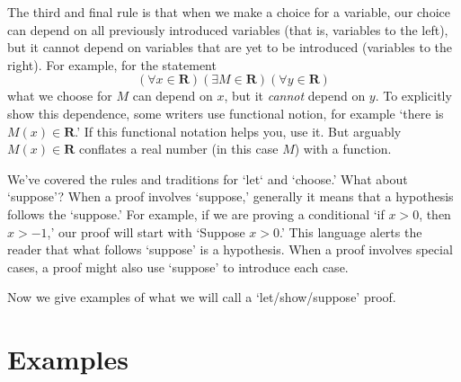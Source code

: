 \documentclass[12pt,fleqn]{article}
\newcommand{\reals}{\mathbf{R}}
\newcounter{ex}\setcounter{ex}{0}
\begin{document}
The third and final rule is that when we  make a choice for a variable, our choice can depend on all previously
introduced variables (that is, variables to the left), but it cannot  depend on variables that are yet to be introduced (variables to the right). 
For example, for the statement
\begin{equation*}
   \left(\forall x \in \reals\right)
   \left(\exists M \in \reals\right)
   \left(\forall y \in \reals \right)
 \end{equation*}
 what we choose for $M$ can depend on $x$, but it \emph{cannot}  depend on $y$. To explicitly show this dependence, some writers
 use functional notion, for example `there is $M(x) \in \reals$.'  If this functional notation helps you, use it. But arguably  
 $M(x) \in \reals$ conflates a real number (in this case $M$) with a function.

We've covered the rules and traditions for `let` and `choose.' What about `suppose'?  When a proof involves `suppose,' generally 
it means that a hypothesis follows the `suppose.' For example, if we are proving a conditional `if $x > 0$, then $x > -1$,' our proof will start with 
`Suppose $x > 0$.' This language alerts the reader that what follows `suppose' is a hypothesis.  When a proof involves special cases, 
a proof might also use `suppose' to introduce each case.

Now we give examples of what we will call a `let/show/suppose' proof.

\section{Examples}
            
\end{document}

